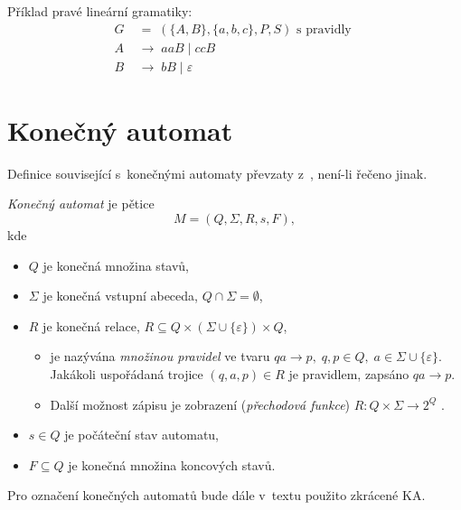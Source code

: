 \begin{example}
    Příklad pravé lineární gramatiky:
    \begin{align*}
        G \; &= \; (\{A, B\}, \{a, b, c\}, P, S) \text{ s~pravidly } \\
        A \; &\rightarrow \; aaB \; | \; ccB \\
        B \; &\rightarrow \; bB \; | \; \varepsilon
    \end{align*}
\end{example}

\section{Konečný automat}
Definice související s~konečnými automaty převzaty z~\cite{meduna2023automata}, není-li řečeno jinak.
\begin{definition}\label{def_konecny_automat}
    \emph{Konečný automat} je pětice
    \begin{equation*}
        M = (Q, \Sigma, R, s, F),
    \end{equation*}
    kde
    \begin{itemize}
        \item $Q$ je konečná množina stavů,
        \item $\Sigma$ je konečná vstupní abeceda, $Q \cap \Sigma = \emptyset$,
        \item $R$ je konečná relace, $R \subseteq Q \times (\Sigma \cup \{\varepsilon\}) \times Q$,
        \begin{itemize}[label=$\circ$]
            \item je nazývána \emph{množinou pravidel} ve tvaru $qa \rightarrow p,\; q, p \in Q,\;a \in \Sigma \cup \{\varepsilon\}$.
            Jakákoli uspořádaná trojice $(q, a, p) \in R$ je pravidlem, zapsáno $qa \rightarrow p$.
            \item Další možnost zápisu je zobrazení (\emph{přechodová funkce}) $R: Q \times \Sigma \rightarrow 2^Q$ \cite{TIN-opora}.
        \end{itemize}
        \item $s \in Q$ je počáteční stav automatu,
        \item $F \subseteq Q$ je konečná množina koncových stavů. 
    \end{itemize}
\end{definition}

\begin{convention}
    Pro označení konečných automatů bude dále v~textu použito zkrácené KA. 
\end{convention}


